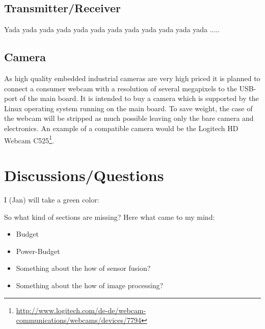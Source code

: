 \documentclass[fontsize=11pt,paper=a4,]{scrartcl}
\begin{document}
\subsection*{Transmitter/Receiver}

Yada yada yada yada yada yada yada yada yada yada yada yada .....

\subsection*{Camera}

As high quality embedded industrial cameras are very high priced it is planned to connect a consumer webcam with a resolution of several megapixels to the USB-port of the main board. It is intended to buy a camera which is supported by the Linux operating system running on the main board. To save weight, the case of the webcam will be stripped as much possible leaving only the bare camera and electronics. An example of a compatible camera would be the Logitech HD Webcam C525\footnote{\url{http://www.logitech.com/de-de/webcam-communications/webcams/devices/7794}}.


\section{Discussions/Questions}

I (Jan) will take {\color{green} a green color}:

{\color{green} So what kind of sections are missing? Here what came to my mind:
\begin{itemize}
 \item Budget
 \item Power-Budget
 \item Something about the how of sensor fusion?
 \item Something about the how of image processing?
\end{itemize}
}
\end{document}
